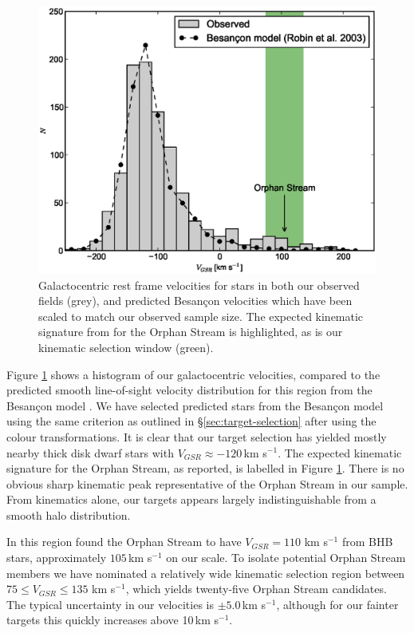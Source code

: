 \documentclass[10pt,apjl]{emulateapj}
\begin{document}
\begin{figure}[h]
	\includegraphics[width=\columnwidth]{./fig1.eps}
	\caption{Galactocentric rest frame velocities for stars in both our observed fields (grey), and predicted Besan\c{c}on velocities which have been scaled to match our observed sample size. The expected kinematic signature from \citet{Newberg_et-al_2010} for the Orphan Stream is highlighted, as is our kinematic selection window (green).}
	\label{fig:velocities}
\end{figure}

Figure \ref{fig:velocities} shows a histogram of our galactocentric velocities, compared to the predicted smooth line-of-sight velocity distribution for this region from the Besan\c{c}on model \citep{Robin_et-al_2003}. We have selected predicted stars from the Besan\c{c}on model using the same criterion as outlined in \S\ref{sec:target-selection} after using the \citet{Jordi_et-al_2006} colour transformations. It is clear that our target selection has yielded mostly nearby thick disk dwarf stars with $V_{GSR} \approx -120$\,km s$^{-1}$. The expected kinematic signature for the Orphan Stream, as \citet{Newberg_et-al_2010} reported, is labelled in Figure \ref{fig:velocities}. There is no obvious sharp kinematic peak representative of the Orphan Stream in our sample. From kinematics alone, our targets appears largely indistinguishable from a smooth halo distribution.

In this region \citet{Newberg_et-al_2010} found the Orphan Stream to have $V_{GSR} = 110$ km s$^{-1}$ from BHB stars, approximately $105$\,km s$^{-1}$ on our scale. To isolate potential Orphan Stream members we have nominated a relatively wide kinematic selection region between $75 \leq V_{GSR} \leq 135$ km s$^{-1}$, which yields twenty-five Orphan Stream candidates. The typical uncertainty in our velocities is $\pm{}5.0$\,km s$^{-1}$, although for our fainter targets this quickly increases above 10\,km s$^{-1}$.
\end{document}

